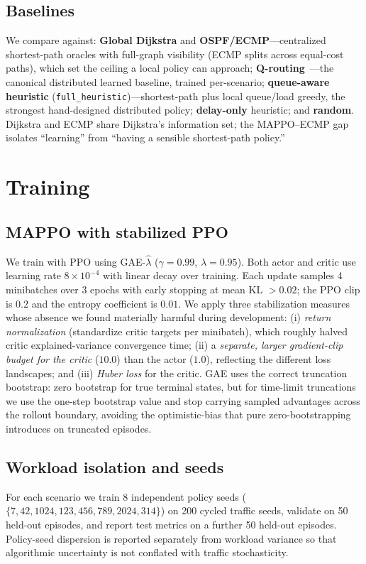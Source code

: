 \documentclass[conference,10pt]{IEEEtran}
\begin{document}
\subsection{Baselines}
We compare against: \textbf{Global Dijkstra} and \textbf{OSPF/ECMP}---centralized shortest-path oracles with full-graph visibility (ECMP splits across equal-cost paths), which set the ceiling a local policy can approach; \textbf{Q-routing}~\cite{boyan1994q}---the canonical distributed learned baseline, trained per-scenario; \textbf{queue-aware heuristic} (\texttt{full\_heuristic})---shortest-path plus local queue/load greedy, the strongest hand-designed distributed policy; \textbf{delay-only} heuristic; and \textbf{random}. Dijkstra and ECMP share Dijkstra's information set; the MAPPO--ECMP gap isolates ``learning'' from ``having a sensible shortest-path policy.''

\section{Training}
\label{sec:training}

\subsection{MAPPO with stabilized PPO}
We train with PPO using GAE-$\hat{\lambda}$ ($\gamma=0.99$, $\lambda=0.95$). Both actor and critic use learning rate $8\times10^{-4}$ with linear decay over training. Each update samples 4 minibatches over 3 epochs with early stopping at mean KL $>0.02$; the PPO clip is $0.2$ and the entropy coefficient is $0.01$. We apply three stabilization measures whose absence we found materially harmful during development: (i) \emph{return normalization} (standardize critic targets per minibatch), which roughly halved critic explained-variance convergence time; (ii) a \emph{separate, larger gradient-clip budget for the critic} ($10.0$) than the actor ($1.0$), reflecting the different loss landscapes; and (iii) \emph{Huber loss} for the critic. GAE uses the correct truncation bootstrap: zero bootstrap for true terminal states, but for time-limit truncations we use the one-step bootstrap value and stop carrying sampled advantages across the rollout boundary, avoiding the optimistic-bias that pure zero-bootstrapping introduces on truncated episodes.

\subsection{Workload isolation and seeds}
For each scenario we train 8 independent policy seeds ($\{7,42,1024,123,456,789,2024,314\}$) on 200 cycled traffic seeds, validate on 50 held-out episodes, and report test metrics on a further 50 held-out episodes. Policy-seed dispersion is reported separately from workload variance so that algorithmic uncertainty is not conflated with traffic stochasticity.
\end{document}
